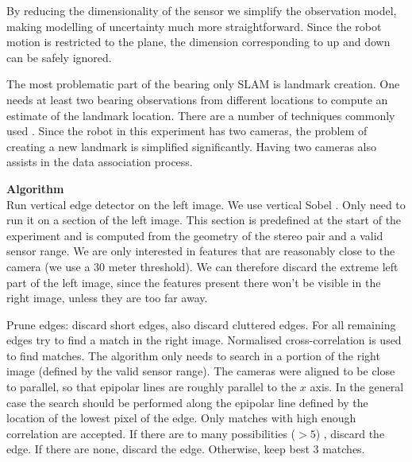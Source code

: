 By reducing the dimensionality of the sensor we simplify the
observation model, making modelling of uncertainty much more
straightforward. Since the robot motion is restricted to the plane,
the dimension corresponding to up and down can be safely ignored.

The most problematic part of the bearing only SLAM is landmark
creation. One needs at least two bearing observations from different
locations to compute an estimate of the landmark location. There are a
number of techniques commonly used \cite{bearing_only_slam}. Since the
robot in this experiment has two cameras, the problem of creating a
new landmark is simplified significantly. Having two cameras also
assists in the data association process. 





{\bf Algorithm }\\
Run vertical edge detector on the left image. We use vertical Sobel
\cite{Hartley2004}. Only need to run it on a section of the left
image. This section is predefined at the start of the experiment and
is computed from the geometry of the stereo pair and a valid sensor
range. We are only interested in features that are reasonably
close to the camera (we use a 30 meter threshold). We can therefore
discard the extreme left part of the left image, since the features
present there won't be visible in the right image, unless they are too
far away.

Prune edges: discard short edges, also discard cluttered edges. For
all remaining edges try to find a match in the right image. Normalised
cross-correlation is used to find matches. The algorithm only needs to
search in a portion of the right image (defined by the valid sensor
range). The cameras were aligned to be close to parallel, so that
epipolar lines are roughly parallel to the $x$ axis. In the general
case the search should be performed along the epipolar line defined by
the location of the lowest pixel of the edge. Only matches with high
enough correlation are accepted. If there are to many possibilities
($> 5$) , discard the edge. If there are none, discard the
edge. Otherwise, keep best 3 matches.

